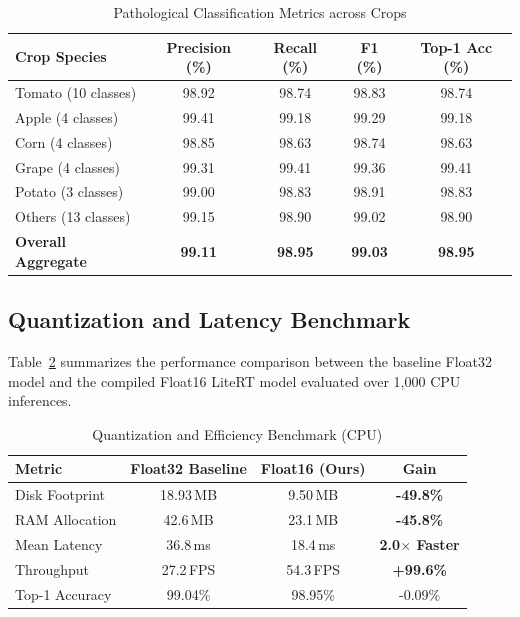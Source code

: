 \documentclass[conference]{IEEEtran}
\begin{document}
\begin{table}[htbp]
\caption{Pathological Classification Metrics across Crops}
\label{tab:accuracy}
\centering
\begin{tabular}{lcccc}
\toprule
\textbf{Crop Species} & \textbf{Precision (\%)} & \textbf{Recall (\%)} & \textbf{F1 (\%)} & \textbf{Top-1 Acc (\%)} \\
\midrule
Tomato (10 classes)  & 98.92 & 98.74 & 98.83 & 98.74 \\
Apple (4 classes)    & 99.41 & 99.18 & 99.29 & 99.18 \\
Corn (4 classes)     & 98.85 & 98.63 & 98.74 & 98.63 \\
Grape (4 classes)    & 99.31 & 99.41 & 99.36 & 99.41 \\
Potato (3 classes)   & 99.00 & 98.83 & 98.91 & 98.83 \\
Others (13 classes)  & 99.15 & 98.90 & 99.02 & 98.90 \\
\midrule
\textbf{Overall Aggregate} & \textbf{99.11} & \textbf{98.95} & \textbf{99.03} & \textbf{98.95} \\
\bottomrule
\end{tabular}
\end{table}

\subsection{Quantization and Latency Benchmark}
Table~\ref{tab:quantization} summarizes the performance comparison between the baseline Float32 model and the compiled Float16 LiteRT model evaluated over 1,000 CPU inferences.

\begin{table}[htbp]
\caption{Quantization and Efficiency Benchmark (CPU)}
\label{tab:quantization}
\centering
\begin{tabular}{lccc}
\toprule
\textbf{Metric} & \textbf{Float32 Baseline} & \textbf{Float16 (Ours)} & \textbf{Gain} \\
\midrule
Disk Footprint & 18.93\,MB & 9.50\,MB & \textbf{-49.8\%} \\
RAM Allocation & 42.6\,MB  & 23.1\,MB & \textbf{-45.8\%} \\
Mean Latency   & 36.8\,ms  & 18.4\,ms & \textbf{2.0$\times$ Faster} \\
Throughput     & 27.2\,FPS & 54.3\,FPS & \textbf{+99.6\%} \\
Top-1 Accuracy & 99.04\%   & 98.95\%  & -0.09\% \\
\bottomrule
\end{tabular}
\end{table}
\end{document}
